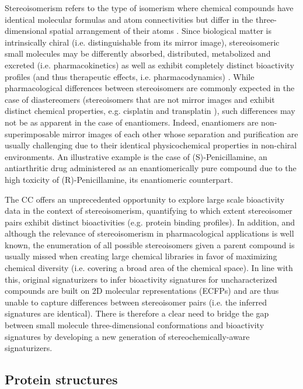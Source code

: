 Stereoisomerism refers to the type of isomerism where chemical compounds have identical molecular formulas and atom connectivities but differ in the three-dimensional spatial arrangement of their atoms \cite{gold_iupac_2019}. Since biological matter is intrinsically chiral (i.e. distinguishable from its mirror image), stereoisomeric small molecules may be differently absorbed, distributed, metabolized and excreted (i.e. pharmacokinetics) as well as exhibit completely distinct bioactivity profiles (and thus therapeutic effects, i.e. pharmacodynamics) \cite{inaki_cell_2016, mcconathy_stereochemistry_2003}. While pharmacological differences between stereoisomers are commonly expected in the case of diastereomers (stereoisomers that are not mirror images and exhibit distinct chemical properties, e.g. cisplatin and transplatin \cite{dasari_cisplatin_2014, trudu_coordination_2015}), such differences may not be as apparent in the case of enantiomers. Indeed, enantiomers are non-superimposable mirror images of each other whose separation and purification are usually challenging due to their identical physicochemical properties in non-chiral environments\cite{ward_chiral_2012}. An illustrative example is the case of (S)-Penicillamine, an antiarthritic drug administered as an enantiomerically pure compound due to the high toxicity of (R)-Penicillamine, its enantiomeric counterpart\cite{aronson_meylers_2010}. 

The CC offers an unprecedented opportunity to explore large scale bioactivity data in the context of stereoisomerism, quantifying to which extent stereoisomer pairs exhibit distinct bioactivities (e.g. protein binding profiles). In addition, and although the relevance of stereoisomerism in pharmacological applications is well known, the enumeration of all possible stereoisomers given a parent compound is usually missed when creating large chemical libraries in favor of maximizing chemical diversity (i.e. covering a broad area of the chemical space)\cite{ruddigkeit_enumeration_2012}. In line with this, original signaturizers to infer bioactivity signatures for uncharacterized compounds are built on 2D molecular representations (ECFPs) and are thus unable to capture differences between stereoisomer pairs (i.e. the inferred signatures are identical). There is therefore a clear need to bridge the gap between small molecule three-dimensional conformations and bioactivity signatures by developing a new generation of stereochemically-aware signaturizers.

\subsection{Protein structures}
\label{Introduction_proteinstructures}

